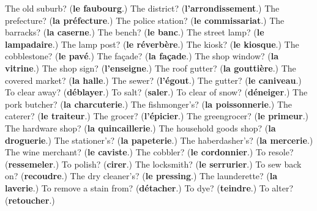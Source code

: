\begin{tcolorbox}[breakable,colback=teal!4,colframe=teal!35!black,title={Before you move on}]
The old suburb? (\textbf{le faubourg}.) The district? (\textbf{l'arrondissement}.) The prefecture? (\textbf{la préfecture}.) The police station? (\textbf{le commissariat}.) The barracks? (\textbf{la caserne}.) The bench? (\textbf{le banc}.) The street lamp? (\textbf{le lampadaire}.) The lamp post? (\textbf{le réverbère}.) The kiosk? (\textbf{le kiosque}.) The cobblestone? (\textbf{le pavé}.) The façade? (\textbf{la façade}.) The shop window? (\textbf{la vitrine}.) The shop sign? (\textbf{l'enseigne}.) The roof gutter? (\textbf{la gouttière}.) The covered market? (\textbf{la halle}.) The sewer? (\textbf{l'égout}.) The gutter? (\textbf{le caniveau}.) To clear away? (\textbf{déblayer}.) To salt? (\textbf{saler}.) To clear of snow? (\textbf{déneiger}.) The pork butcher? (\textbf{la charcuterie}.) The fishmonger’s? (\textbf{la poissonnerie}.) The caterer? (\textbf{le traiteur}.) The grocer? (\textbf{l'épicier}.) The greengrocer? (\textbf{le primeur}.) The hardware shop? (\textbf{la quincaillerie}.) The household goods shop? (\textbf{la droguerie}.) The stationer’s? (\textbf{la papeterie}.) The haberdasher’s? (\textbf{la mercerie}.) The wine merchant? (\textbf{le caviste}.) The cobbler? (\textbf{le cordonnier}.) To resole? (\textbf{ressemeler}.) To polish? (\textbf{cirer}.) The locksmith? (\textbf{le serrurier}.) To sew back on? (\textbf{recoudre}.) The dry cleaner’s? (\textbf{le pressing}.) The launderette? (\textbf{la laverie}.) To remove a stain from? (\textbf{détacher}.) To dye? (\textbf{teindre}.) To alter? (\textbf{retoucher}.)
\end{tcolorbox}
